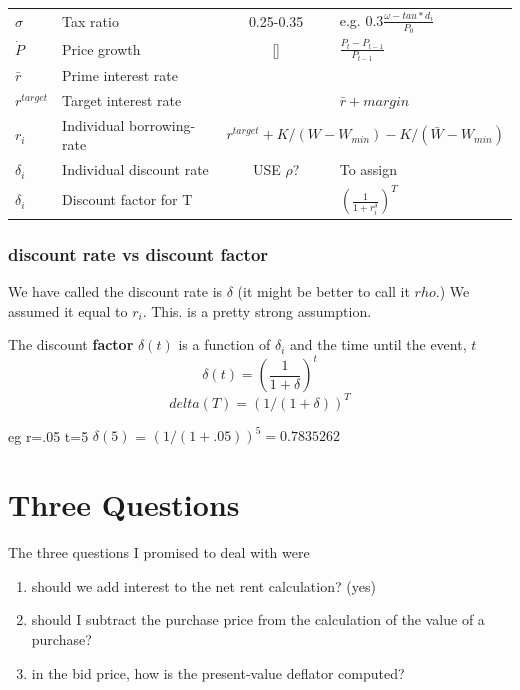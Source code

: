 \begin{longtable}{lp{5cm}cp{2.5cm}}
$\sigma$       & Tax ratio                            & 0.25-0.35  & e.g. $ 0.3\frac{\omega-tau*d_i}{P_0}$ \\
$\dot P $      & Price growth                         & []         & $\frac{P_t-P_{t-1}}{P_{t-1}}$\\
$\bar r$       & Prime interest rate                  &            & \\
$r^{target}$   & Target interest rate                 &            & $\bar r + margin$ \\
$r_i$          & Individual borrowing-rate            & \multicolumn{2}{c}{ $r^{target}+ K/(W-W_{min}) -K/(\bar W - W_{min})$}\\
$\delta_i$   & Individual discount rate        &  USE $\rho$?          & To assign \\
$\delta_i$     & Discount factor for T                &            & $\left(\frac{1}{1+r_i^\delta}\right)^T$ \\
\hline
\end{longtable}
\renewcommand{\arraystretch}{1.0}




\subsection{discount rate vs discount factor}
We have called the  discount rate is $\delta$ (it might be better to call it $rho$.) We assumed it equal to $r_i$. This. is a pretty strong assumption. \

The discount \textbf{factor} $\delta(t)$ is a function of $\delta_i$ and the time until the event, $t$
\[\delta(t)=\left(\frac{1}{1+\delta}\right)^t\]
    \[delta(T)=  (1/(1+\delta))^T\]   
    

    eg r=.05  t=5  $\delta(5)$ =  $(1/(1+.05))^5 = 0.7835262$

\chapter{Three Questions}

The three questions I promised to deal with were
\begin{enumerate}
    \item should we add interest to the net rent calculation? (yes)
    \item should I subtract the purchase price from the calculation of the value of a purchase?
    \item in the bid price, how is the present-value deflator computed?
\end{enumerate}




